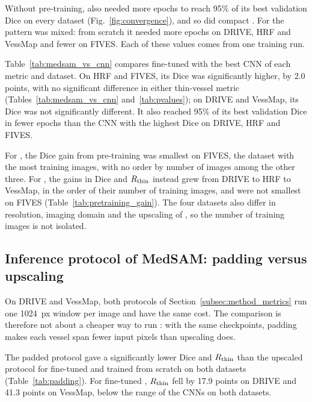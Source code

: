 Without pre-training, \medsam{} also needed more epochs to reach 95\% of its best validation Dice on every dataset (Fig.~\ref{fig:convergence}), and so did compact \medsam{}. For \litemedsam{} the pattern was mixed: from scratch it needed more epochs on DRIVE, HRF and VessMap and fewer on FIVES. Each of these values comes from one training run.

Table~\ref{tab:medsam_vs_cnn} compares fine-tuned \medsam{} with the best CNN of each metric and dataset. On HRF and FIVES, its Dice was significantly higher, by 2.0 points, with no significant difference in either thin-vessel metric (Tables~\ref{tab:medsam_vs_cnn} and~\ref{tab:pvalues}); on DRIVE and VessMap, its Dice was not significantly different. It also reached 95\% of its best validation Dice in fewer epochs than the CNN with the highest Dice on DRIVE, HRF and FIVES.

For \medsam{}, the Dice gain from pre-training was smallest on FIVES, the dataset with the most training images, with no order by number of images among the other three. For \litemedsam{}, the gains in Dice and $R_{\mathrm{thin}}$ instead grew from DRIVE to HRF to VessMap, in the order of their number of training images, and were not smallest on FIVES (Table~\ref{tab:pretraining_gain}). The four datasets also differ in resolution, imaging domain and the upscaling of \medsam{}, so the number of training images is not isolated.





\subsection{Inference protocol of MedSAM: padding versus upscaling}
\label{subsec:results_padding}

On DRIVE and VessMap, both protocols of Section~\ref{subsec:method_metrics} run one 1024~px window per image and have the same cost. The comparison is therefore not about a cheaper way to run \medsam{}: with the same checkpoints, padding makes each vessel span fewer input pixels than upscaling does.

The padded protocol gave a significantly lower Dice and $R_{\mathrm{thin}}$ than the upscaled protocol for fine-tuned \medsam{} and \medsam{} trained from scratch on both datasets (Table~\ref{tab:padding}). For fine-tuned \medsam{}, $R_{\mathrm{thin}}$ fell by 17.9 points on DRIVE and 41.3 points on VessMap, below the range of the CNNs on both datasets.

